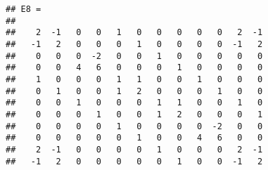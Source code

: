 \begin{samepage}
\begin{Shaded}
	\begin{Highlighting}[]
\NormalTok{v=[}\NormalTok{;}\NormalTok{,}\NormalTok{);}\NormalTok{];}
\NormalTok{v1=[}\NormalTok{;}\NormalTok{;}\NormalTok{,}\NormalTok{);}\NormalTok{;}\NormalTok{];}
\NormalTok{v2=[}\NormalTok{;}\NormalTok{;}\NormalTok{(}\NormalTok{));}\NormalTok{;}\NormalTok{];}

\NormalTok{(}
\NormalTok{(}\NormalTok{(}
\NormalTok{(}\NormalTok{(}\NormalTok{(}\NormalTok{)),}\NormalTok{),}\NormalTok{(}\NormalTok{)) +\textbackslash{}}
\NormalTok{(}\NormalTok{(}\NormalTok{(}\NormalTok{)),-}\NormalTok{),}\NormalTok{(}\NormalTok{))+\textbackslash{}}
\NormalTok{(}		
	\end{Highlighting}
\end{Shaded}
\end{samepage}

\begin{samepage}
\begin{verbatim}
## E8 =
## 
##    2  -1   0   0   1   0   0   0   0   0   2  -1
##   -1   2   0   0   0   1   0   0   0   0  -1   2
##    0   0   0  -2   0   0   1   0   0   0   0   0
##    0   0   4   6   0   0   0   1   0   0   0   0
##    1   0   0   0   1   1   0   0   1   0   0   0
##    0   1   0   0   1   2   0   0   0   1   0   0
##    0   0   1   0   0   0   1   1   0   0   1   0
##    0   0   0   1   0   0   1   2   0   0   0   1
##    0   0   0   0   1   0   0   0   0  -2   0   0
##    0   0   0   0   0   1   0   0   4   6   0   0
##    2  -1   0   0   0   0   1   0   0   0   2  -1
##   -1   2   0   0   0   0   0   1   0   0  -1   2
\end{verbatim}
\end{samepage}
